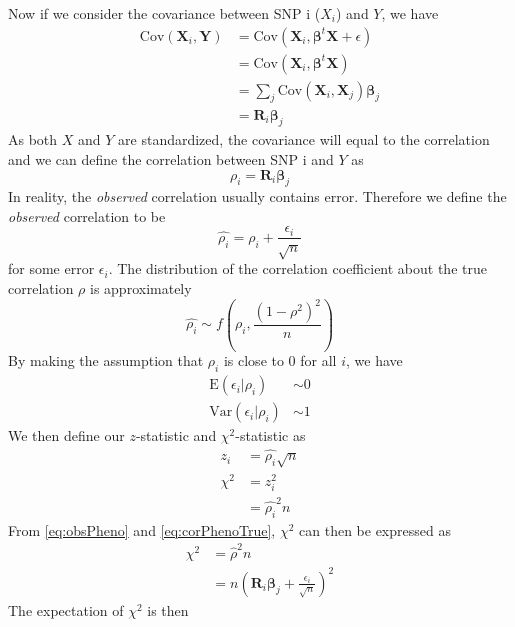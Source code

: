 			Now if we consider the covariance between \gls{SNP} i ($X_i$) and $Y$, we have
			\begin{align}
			 \mathrm{Cov}(\boldsymbol{X}_i,\boldsymbol{Y}) &= \mathrm{Cov}(\boldsymbol{X}_i,\boldsymbol{\beta}^t\boldsymbol{X}+\epsilon) \nonumber\\
			 &=\mathrm{Cov}(\boldsymbol{X}_i,\boldsymbol{\beta}^t\boldsymbol{X}) \nonumber\\
			 &=\sum_j{\mathrm{Cov}(\boldsymbol{X}_i,\boldsymbol{X}_j)\boldsymbol{\beta}_j} \nonumber\\
			 &=\boldsymbol{R}_i\boldsymbol{\beta}_j
			 \label{eq:covPhenoTrue}
			\end{align}
			As both $X$ and $Y$ are standardized, the covariance will equal to the correlation and we can define the correlation between \gls{SNP} i and $Y$ as
			\begin{equation}
				\rho_i = \boldsymbol{R}_i\boldsymbol{\beta}_j
				\label{eq:corPhenoTrue}
			\end{equation}
			In reality, the \emph{observed} correlation usually contains error. 
			Therefore we define the \emph{observed} correlation to be
			\begin{equation}
			\hat{\rho_i} = \rho_i+\frac{\epsilon_i}{\sqrt{n}}
			\label{eq:obsPheno}
			\end{equation}
			for some error $\epsilon_i$. 
			The distribution of the correlation coefficient about the true correlation $\rho$ is approximately
			$$
				\hat{\rho_i}\sim f(\rho_i, \frac{(1-\rho^2)^2}{n})
			$$
			By making the assumption that $\rho_i$ is close to 0 for all $i$, we have 
			\begin{align*}
				\mathrm{E}(\epsilon_i|\rho_i)&\sim 0\\
				\mathrm{Var}(\epsilon_i|\rho_i)&\sim 1
			\end{align*}
			We then define our $z$-statistic and $\chi^2$-statistic as
			\begin{align*}
				z_i &= \hat{\rho_i}\sqrt{n} \\
				\chi^2 &= z_i^2\\
				&=\hat{\rho_i}^2n
			\end{align*}
			From \cref{eq:obsPheno} and \cref{eq:corPhenoTrue}, $\chi^2$ can then be expressed as
			\begin{align*}
			\chi^2&=\hat{\rho}^2n\\
			&=n(\boldsymbol{R}_i\boldsymbol{\beta}_j+\frac{\epsilon_i}{\sqrt{n}})^2
			\end{align*}
			The expectation of $\chi^2$ is then

